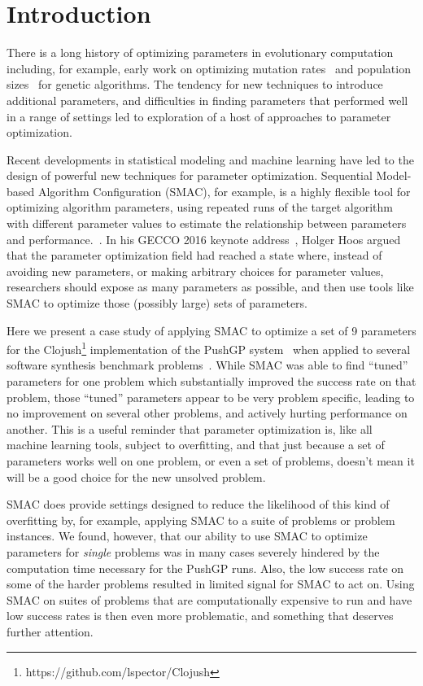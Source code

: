 \section{Introduction}
\label{sec:introduction}

There is a long history of optimizing parameters in evolutionary computation
including, for example, early work on optimizing mutation rates~\cite{back1993optimal} and 
population sizes~\cite{alander1992optimal} for genetic algorithms.
The tendency for new techniques to introduce additional parameters, 
and difficulties in finding parameters that performed well in a range of
settings led to exploration of a host of approaches to parameter
optimization.~\cite{lobo2007parameter}

Recent developments in statistical modeling and machine learning have
led to the design of powerful new techniques for parameter optimization. 
Sequential Model-based Algorithm Configuration (SMAC), for example, is a
highly flexible tool for optimizing algorithm parameters, using repeated runs
of the target algorithm with different parameter values to estimate
the relationship between parameters and performance.~\cite{HutHooLey11-SMAC}. In his GECCO 2016 keynote 
address~\cite{Hoos:2016:TCM:2908812.2908960}, Holger Hoos argued
that the parameter optimization field had reached a state where, 
instead of avoiding new
parameters, or making arbitrary choices for parameter values, researchers
should expose as many parameters as possible, and then use tools like
SMAC to optimize those (possibly large) sets of parameters.

Here we present a case study of applying SMAC to optimize a
set of 9 parameters for the Clojush\footnote{https://github.com/lspector/Clojush} 
implementation of the PushGP system~\cite{spector:2002:GPEM,push3gecco}
when applied to several software synthesis 
benchmark problems~\cite{Helmuth:2015:GECCO}. While SMAC was able to
find ``tuned'' parameters for one problem which substantially improved
the success rate on that problem, those ``tuned'' parameters appear to
be very problem specific, leading to no improvement on several other
problems, and actively hurting performance on another. This is a useful
reminder that parameter optimization is, like all machine learning tools,
subject to overfitting, and that just because a set of parameters works 
well on one problem, or even a set of problems, doesn't mean it will be
a good choice for the new unsolved problem.

SMAC does provide settings designed to reduce the likelihood of this kind of
overfitting by, for example, applying SMAC to a suite of problems or problem
instances. We found, however, that
our ability to use SMAC to optimize parameters for \emph{single} problems
was in many cases severely
hindered by the computation time necessary for the PushGP runs.
Also, the low
success rate on some of the harder problems resulted in limited
signal for SMAC to act on. Using SMAC on suites of problems that are
computationally expensive to run and have low success rates is then even
more problematic, and something that deserves further attention.

